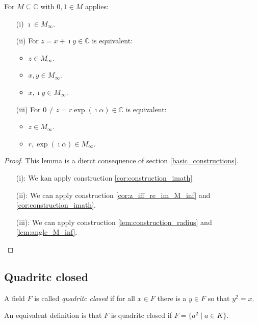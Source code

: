 \begin{lemma}
    \label{lem:M_inf_properties}
    \leanok
    For $M\subseteq \mathbb{C}$ with $0,1 \in M$ applies:
    \begin{itemize}
        \item[(i)] $\imath \in M_{\infty}$.
        \item[(ii)] For $z = x + \imath y \in \mathbb{C}$ is equivalent:
            \begin{itemize}
                \item $z \in M_{\infty}$.
                \item $x, y \in M_{\infty}$.
                \item $x, \imath y \in M_{\infty}$.
            \end{itemize}
        \item[(iii)] 
            For $0 \ne z = r \exp(\imath \alpha) \in \mathbb{C}$ is equivalent:
            \begin{itemize}
                \item $z \in M_{\infty}$.
                \item $r,\exp(\imath \alpha) \in M_{\infty}$.
            \end{itemize}
    \end{itemize}
\end{lemma}
\begin{proof}
    This lemma is a dierct consequence of section \ref{basic_constructions}.
    \begin{itemize}
        \item[(i):] We kan apply construction \ref{cor:construction_imath}
        \item[(ii):] We can apply construction \ref{cor:z_iff_re_im_M_inf} and \ref{cor:construction_imath}.
        \item[(iii):]  We can apply construction \ref{lem:construction_radius} and \ref{lem:angle_M_inf}.
    \end{itemize}
\end{proof}

\subsection*{Quadritc closed}
\begin{definition}
    \label{def:quadritc_closed_field}
    \leanok
    A field $F$ is called \emph{quadritc closed} if for all $x \in F$ there is a $y \in F$ so that $y^2 = x$.
\end{definition}
\begin{remark}
    An equivalent definition is that $F$ is quadritc closed if $F=\{a^2\mid a \in K\}$.
\end{remark}

